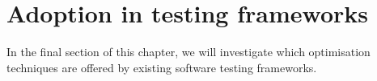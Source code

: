 
\section{Adoption in testing frameworks}
In the final section of this chapter, we will investigate which optimisation techniques are offered by existing software testing frameworks.



